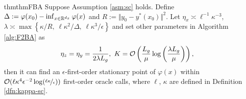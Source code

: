 \documentclass[twoside,11pt]{article}
\begin{document}



\begin{restatable}{thm}{thmFBA}\label{thm:F2BA}
Suppose Assumption \ref{asm:sc} holds. Define
$\Delta:=\varphi(x_0) - \inf_{x \in {\mathbb{R}}^{d_x}} \varphi(x)$ and $R := \Vert y_0 - y^*(x_0) \Vert^2 $.
Let $\eta_x \asymp \ell^{-1}\kappa^{-3}$, $\lambda \asymp \max\left\{\kappa/R,~ \ell \kappa^2/ \Delta, ~ \ell \kappa^3 / \epsilon \right\} $
and set other parameters 
in Algorithm \ref{alg:F2BA} as
\begin{align*}
     \eta_z = \eta_y = \frac{1}{2 \lambda L_g},~ K = {\mathcal{O}}\left( \frac{L_g }{\mu} \log \left( \frac{\lambda L_g}{\mu} \right) \right),
\end{align*}
then it
can find an $\epsilon$-first-order stationary point of $\varphi(x)$ within ${\mathcal{O}}( \ell \kappa^4 \epsilon^{-2} \log(\nicefrac{\ell \kappa}{\epsilon})) $ first-order oracle calls, where $\ell$,  $\kappa$ are defined in Definition \ref{dfn:kappa-sc}.
\end{restatable}
\end{document}
